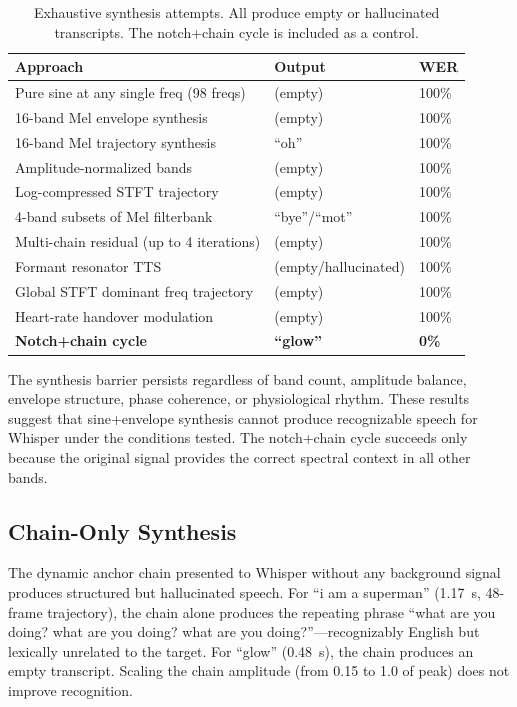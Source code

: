\documentclass[11pt,a4paper]{article}
\begin{document}
\begin{table}[H]
\centering
\caption{Exhaustive synthesis attempts. All produce empty or hallucinated
transcripts. The notch+chain cycle is included as a control.}
\label{tab:synthesis}
\begin{tabular}{@{}lll@{}}
\toprule
\textbf{Approach} & \textbf{Output} & \textbf{WER} \\
\midrule
Pure sine at any single freq (98 freqs) & (empty) & 100\% \\
16-band Mel envelope synthesis & (empty) & 100\% \\
16-band Mel trajectory synthesis & ``oh'' & 100\% \\
Amplitude-normalized bands & (empty) & 100\% \\
Log-compressed STFT trajectory & (empty) & 100\% \\
4-band subsets of Mel filterbank & ``bye''/``mot'' & 100\% \\
Multi-chain residual (up to 4 iterations) & (empty) & 100\% \\
Formant resonator TTS & (empty/hallucinated) & 100\% \\
Global STFT dominant freq trajectory & (empty) & 100\% \\
Heart-rate handover modulation & (empty) & 100\% \\
\midrule
\textbf{Notch+chain cycle} & \textbf{``glow''} & \textbf{0\%} \\
\bottomrule
\end{tabular}
\end{table}

The synthesis barrier persists regardless of band count, amplitude balance,
envelope structure, phase coherence, or physiological rhythm. These results suggest that sine+envelope synthesis cannot produce
recognizable speech for Whisper under the conditions tested. The notch+chain cycle succeeds only because the
original signal provides the correct spectral context in all other bands.

\subsection{Chain-Only Synthesis}
The dynamic anchor chain presented to Whisper without any background signal
produces structured but hallucinated speech. For ``i am a superman'' (1.17~s,
48-frame trajectory), the chain alone produces the repeating phrase ``what are
you doing? what are you doing? what are you doing?''---recognizably English but
lexically unrelated to the target. For ``glow'' (0.48~s), the chain produces an
empty transcript. Scaling the chain amplitude (from 0.15 to 1.0 of peak) does
not improve recognition.
\end{document}
